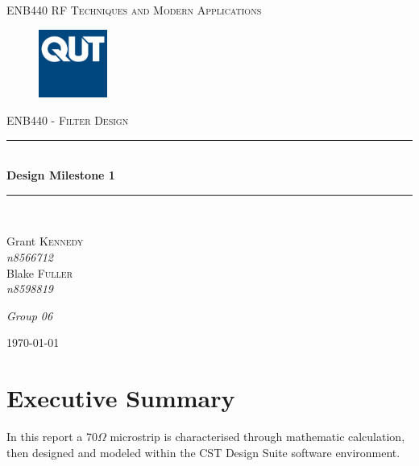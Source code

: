 \documentclass{paper}
\newcommand{\HRule}{\rule{\linewidth}{0.5mm}}
\begin{document}
\newpage
\begin{titlepage}
\begin{center}

\textsc{\LARGE ENB440 RF Techniques and Modern Applications}\\[0.75cm]

\begin{figure}[H]
\centering
\includegraphics[width=0.2\textwidth]{IMG/QUT} \\[0.75cm]
\end{figure}

\textsc{\Large ENB440 - Filter Design}\\[0.5cm]

\HRule \\[0.4cm]
{ \huge \bfseries Design Milestone 1 \\[0.4cm] }

\HRule \\[1.5cm]



\begin{minipage}{0.4\textwidth}
\begin{flushleft} \large
Grant \textsc{Kennedy} \\
\emph{n8566712}\\
Blake \textsc{Fuller} \\
\emph{n8598819}\\
\end{flushleft}
\end{minipage}
\begin{minipage}{0.4\textwidth}
\begin{flushright} \large
\emph{Group 06}\\
\end{flushright}
\end{minipage}

\vfill

{\large \today}
\end{center}
\end{titlepage}

\section*{Executive Summary}
In this report a 70$\Omega$ microstrip is characterised through mathematic calculation, then designed and modeled within the CST Design Suite software environment.\\
\end{document}
